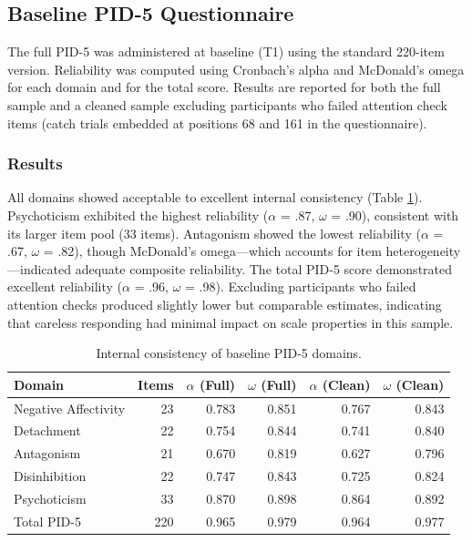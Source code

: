 \documentclass[
  english,
  man,floatsintext]{apa6}
\begin{document}
\subsection{Baseline PID-5 Questionnaire}\label{baseline-pid-5-questionnaire}

The full PID-5 was administered at baseline (T1) using the standard 220-item version. Reliability was computed using Cronbach's alpha and McDonald's omega for each domain and for the total score. Results are reported for both the full sample and a cleaned sample excluding participants who failed attention check items (catch trials embedded at positions 68 and 161 in the questionnaire).

\subsubsection{Results}\label{results}

All domains showed acceptable to excellent internal consistency (Table \ref{tab:table-s1-pid5-reliability}). Psychoticism exhibited the highest reliability (\(\alpha\) = .87, \(\omega\) = .90), consistent with its larger item pool (33 items). Antagonism showed the lowest reliability (\(\alpha\) = .67, \(\omega\) = .82), though McDonald's omega---which accounts for item heterogeneity---indicated adequate composite reliability. The total PID-5 score demonstrated excellent reliability (\(\alpha\) = .96, \(\omega\) = .98). Excluding participants who failed attention checks produced slightly lower but comparable estimates, indicating that careless responding had minimal impact on scale properties in this sample.

\begin{table}

\caption{\label{tab:table-s1-pid5-reliability}Internal consistency of baseline PID-5 domains.}
\centering
\begin{tabular}[t]{lrrrrr}
\toprule
Domain & Items & $\alpha$ (Full) & $\omega$ (Full) & $\alpha$ (Clean) & $\omega$ (Clean)\\
\midrule
Negative Affectivity & 23 & 0.783 & 0.851 & 0.767 & 0.843\\
Detachment & 22 & 0.754 & 0.844 & 0.741 & 0.840\\
Antagonism & 21 & 0.670 & 0.819 & 0.627 & 0.796\\
Disinhibition & 22 & 0.747 & 0.843 & 0.725 & 0.824\\
Psychoticism & 33 & 0.870 & 0.898 & 0.864 & 0.892\\
\addlinespace
Total PID-5 & 220 & 0.965 & 0.979 & 0.964 & 0.977\\
\bottomrule
\end{tabular}
\end{table}
\end{document}
